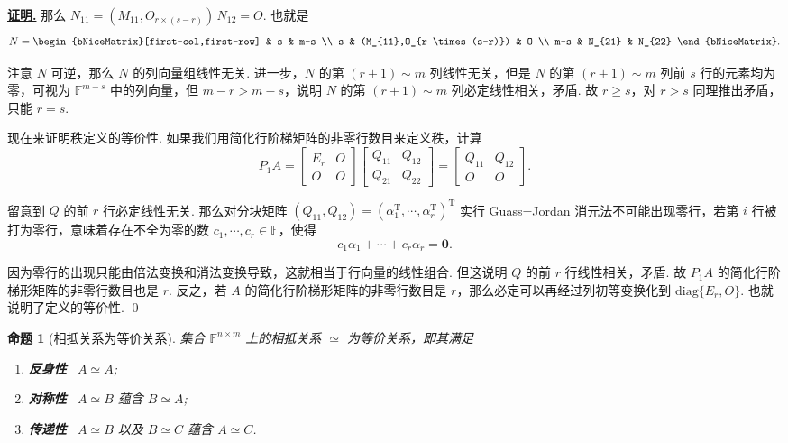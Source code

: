 \documentclass[10pt,openany]{article}
\theoremstyle{thmstyle} %
\theoremstyle{defstyle} %
\theoremstyle{prostyle} %
\newtheorem{proposition}[theorem]{命题}
\theoremstyle{exastyle}
\theoremstyle{remstyle}
\renewenvironment{proof}[1][证明]{\par\underline{\textbf{#1.}} \;\fangsong}{\qed\par}
\newcommand{\T}{^{\text{T}}}
\newcommand{\F}{\mathbb{F}}
\newcommand{\nm}{^{n \times m}}
\newcommand{\diag}{\mathrm{diag}}
\begin{document}
\begin{proof}
	那么 \( N_{11}=(M_{11},O_{r \times (s-r)}) \, N_{12}=O \). 也就是
	\[ N=\begin{bNiceMatrix}[first-col,first-row]
		& s & m-s \\
		s & (M_{11},O_{r \times (s-r)}) & O \\
		m-s & N_{21} & N_{22}
	\end{bNiceMatrix}. \]
	
	注意 \( N \) 可逆，那么 \( N \) 的列向量组线性无关. 进一步，\( N \) 的第 \( (r+1) \sim m \) 列线性无关，但是 \( N \) 的第 \( (r+1) \sim m \) 列前 \( s \) 行的元素均为零，可视为 \( \F^{m-s} \) 中的列向量，但 \( m-r>m-s \)，说明 \( N \) 的第 \( (r+1) \sim m \) 列必定线性相关，矛盾. 故 \( r \geq s \)，对 \( r>s \) 同理推出矛盾，只能 \( r=s \).
	
	现在来证明秩定义的等价性. 如果我们用简化行阶梯矩阵的非零行数目来定义秩，计算
	\[ P_1A=\begin{bmatrix}
		E_r & O \\
		O & O
	\end{bmatrix}\begin{bmatrix}
	Q_{11} & Q_{12} \\
	Q_{21} & Q_{22}
	\end{bmatrix}=\begin{bmatrix}
	Q_{11} & Q_{12} \\
	O & O
	\end{bmatrix}. \]
	
	留意到 \( Q \) 的前 \( r \) 行必定线性无关. 那么对分块矩阵 \( (Q_{11},Q_{12})=(\alpha_1\T,\cdots,\alpha_r\T)\T \) 实行 Guass\(-\)Jordan 消元法不可能出现零行，若第 \( i \) 行被打为零行，意味着存在不全为零的数 \( c_1,\cdots,c_r \in \F \)，使得
	\[ c_1\alpha_1+\cdots+c_r\alpha_r=\bm{0}. \]
	
	因为零行的出现只能由倍法变换和消法变换导致，这就相当于行向量的线性组合. 但这说明 \( Q \) 的前 \( r \) 行线性相关，矛盾. 故 \( P_1A \) 的简化行阶梯形矩阵的非零行数目也是 \( r \). 反之，若 \( A \) 的简化行阶梯形矩阵的非零行数目是 \( r \)，那么必定可以再经过列初等变换化到 \( \diag\{E_r,O \} \).  也就说明了定义的等价性.
\end{proof}

\begin{proposition}[相抵关系为等价关系] \label{3.1.4}
	集合 \( \F\nm \) 上的相抵关系 \( \simeq \) 为等价关系，即其满足
	\begin{enumerate}[(1)]
		\item \textbf{反身性} \ \( A \simeq A \);
		\item \textbf{对称性} \ \( A \simeq B \) 蕴含 \( B \simeq A \);
		\item \textbf{传递性} \ \( A \simeq B \) 以及 \( B \simeq C \) 蕴含 \( A \simeq C \).
	\end{enumerate} 
\end{proposition}
\end{document}
